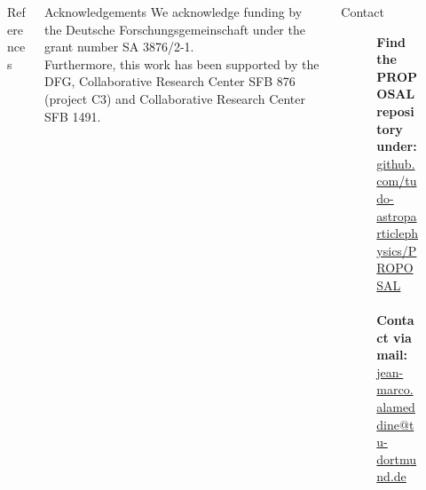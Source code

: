 \documentclass[t]{beamer}
\begin{document}
  \vspace*{\fill}
  \begin{columns}[onlytextwidth]%
    \begin{column}{0.38\linewidth}%
      \begin{block}[equal height group=bottom, fonttitle=\normalsize]{References}
        \begin{multicols}{3}
          \footnotesize%
          \printbibliography%
        \end{multicols}
      \end{block}
    \end{column}
    \begin{column}{0.24\linewidth}%
      \begin{block}[equal height group=bottom, fonttitle=\normalsize]{Acknowledgements}
          We acknowledge funding by the Deutsche Forschungsgemeinschaft under the grant number SA 3876/2-1.\\
          Furthermore, this work has been supported by the DFG, Collaborative Research Center SFB 876 (project C3) and Collaborative Research Center SFB 1491.
      \end{block}
    \end{column}
    \begin{column}{0.38\linewidth}%
      \begin{block}[equal height group=bottom, fonttitle=\normalsize]{Contact}
        \begin{center}
  \begin{figure}[ht]
  \begin{minipage}[ht]{0.75\linewidth}
  \textbf{Find the PROPOSAL repository under:}\\ \url{github.com/tudo-astroparticlephysics/PROPOSAL}\\
  \vspace{0.2em}\\
  \textbf{Contact via mail:}\\ \href{mailto:me@jean-marco.alameddine@tu-dortmund.de}{jean-marco.alameddine@tu-dortmund.de} 


\end{minipage}
\end{figure}
\end{center}
\end{block}
\end{column}
\end{columns}
\end{document}
